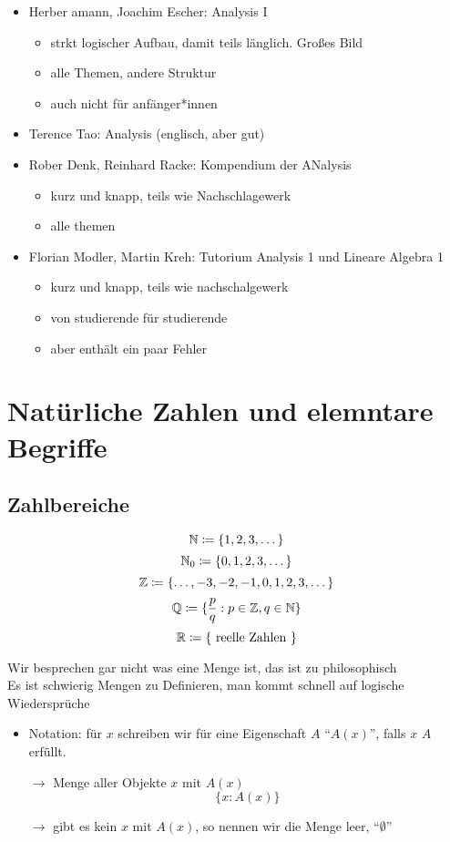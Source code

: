 \documentclass[consecutivenumbering]{gadsescript}
\begin{document}
\begin{itemize}
\begin{itemize}
		\end{itemize}
	\item Herber amann, Joachim Escher: Analysis I
		\begin{itemize}
			\item strkt logischer Aufbau, damit teils länglich. Großes Bild
			\item alle Themen, andere Struktur
			\item auch nicht für anfänger*innen
		\end{itemize}
	\item Terence Tao: Analysis (englisch, aber gut)
	\item Rober Denk, Reinhard Racke: Kompendium der ANalysis
		\begin{itemize}
			\item kurz und knapp, teils wie Nachschlagewerk
			\item alle themen
		\end{itemize}
	\item Florian Modler, Martin Kreh: Tutorium Analysis 1 und Lineare Algebra 1
		\begin{itemize}
			\item kurz und knapp, teils wie nachschalgewerk
			\item von studierende für studierende
			\item aber enthält ein paar Fehler
		\end{itemize}
\end{itemize}

\newpage
\section{Natürliche Zahlen und elemntare Begriffe}
\subsection{Zahlbereiche}
\[ \mathbb{N} \coloneqq \{ 1, 2, 3, \dotsc \} \]
\[ \mathbb{N}_0 \coloneqq \{ 0, 1, 2, 3, \dotsc \} \]
\[ \mathbb{Z} \coloneqq \{ \dotsc, -3, -2, -1, 0, 1, 2, 3, \dotsc \} \]
\[ \mathbb{Q} \coloneqq \{ \frac{p}{q} : p \in \mathbb{Z}, q \in \mathbb{N} \} \]
\[ \mathbb{R} \coloneqq \{ \text{ reelle Zahlen } \} \]

Wir besprechen gar nicht was eine Menge ist, das ist zu philosophisch\\
Es ist schwierig Mengen zu Definieren, man kommt schnell auf logische Wiedersprüche

\begin{itemize}
	\item Notation: für $ x $ schreiben wir für eine Eigenschaft $ A $ ``$ A(x)$'', falls $ x $ $ A $ erfüllt.
	\item[$\rightarrow$] Menge aller Objekte $ x $ mit $ A(x) $
		\[ \{ x : A(x) \} \]
	\item[$\rightarrow$] gibt es kein $ x$ mit $ A(x) $, so nennen wir die Menge leer, ``$\emptyset$''
\end{itemize}
\end{document}
